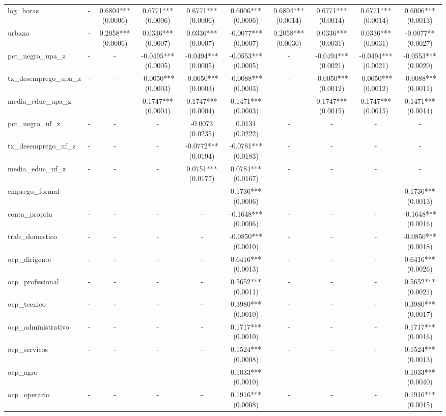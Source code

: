 \begin{table}
\begin{tabular}{lccccccccc}
log_horas & - & 0.6804*** (0.0006) & 0.6771*** (0.0006) & 0.6771*** (0.0006) & 0.6006*** (0.0006) & 0.6804*** (0.0014) & 0.6771*** (0.0014) & 0.6771*** (0.0014) & 0.6006*** (0.0013) \\
urbano & - & 0.2058*** (0.0006) & 0.0336*** (0.0007) & 0.0336*** (0.0007) & -0.0077*** (0.0007) & 0.2058*** (0.0030) & 0.0336*** (0.0031) & 0.0336*** (0.0031) & -0.0077** (0.0027) \\
pct_negro_upa_z & - & - & -0.0495*** (0.0005) & -0.0494*** (0.0005) & -0.0553*** (0.0005) & - & -0.0494*** (0.0021) & -0.0494*** (0.0021) & -0.0553*** (0.0020) \\
tx_desemprego_upa_z & - & - & -0.0050*** (0.0003) & -0.0050*** (0.0003) & -0.0088*** (0.0003) & - & -0.0050*** (0.0012) & -0.0050*** (0.0012) & -0.0088*** (0.0011) \\
media_educ_upa_z & - & - & 0.1747*** (0.0004) & 0.1747*** (0.0004) & 0.1471*** (0.0003) & - & 0.1747*** (0.0015) & 0.1747*** (0.0015) & 0.1471*** (0.0014) \\
pct_negro_uf_z & - & - & - & -0.0073 (0.0235) & 0.0134 (0.0222) & - & - & - & - \\
tx_desemprego_uf_z & - & - & - & -0.0772*** (0.0194) & -0.0781*** (0.0183) & - & - & - & - \\
media_educ_uf_z & - & - & - & 0.0751*** (0.0177) & 0.0784*** (0.0167) & - & - & - & - \\
emprego_formal & - & - & - & - & 0.1736*** (0.0006) & - & - & - & 0.1736*** (0.0013) \\
conta_propria & - & - & - & - & -0.1648*** (0.0006) & - & - & - & -0.1648*** (0.0016) \\
trab_domestico & - & - & - & - & -0.0850*** (0.0010) & - & - & - & -0.0850*** (0.0018) \\
ocp_dirigente & - & - & - & - & 0.6416*** (0.0013) & - & - & - & 0.6416*** (0.0026) \\
ocp_profissional & - & - & - & - & 0.5652*** (0.0011) & - & - & - & 0.5652*** (0.0021) \\
ocp_tecnico & - & - & - & - & 0.3980*** (0.0010) & - & - & - & 0.3980*** (0.0017) \\
ocp_administrativo & - & - & - & - & 0.1717*** (0.0010) & - & - & - & 0.1717*** (0.0016) \\
ocp_servicos & - & - & - & - & 0.1524*** (0.0008) & - & - & - & 0.1524*** (0.0013) \\
ocp_agro & - & - & - & - & 0.1033*** (0.0010) & - & - & - & 0.1033*** (0.0040) \\
ocp_operario & - & - & - & - & 0.1916*** (0.0008) & - & - & - & 0.1916*** (0.0015) \\

\end{tabular}
\end{table}
